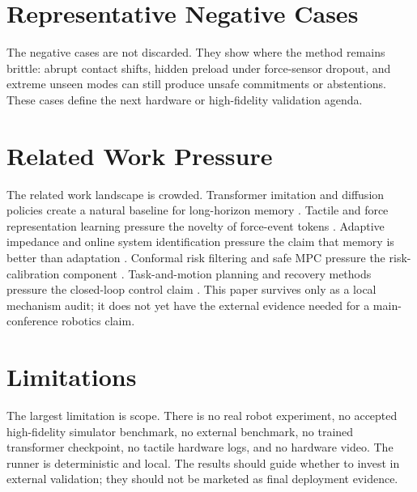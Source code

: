 \documentclass{article}
\begin{document}
\section{Representative Negative Cases}

The negative cases are not discarded. They show where the method remains brittle: abrupt contact shifts, hidden preload under force-sensor dropout, and extreme unseen modes can still produce unsafe commitments or abstentions. These cases define the next hardware or high-fidelity validation agenda.

\section{Related Work Pressure}
The related work landscape is crowded. Transformer imitation and diffusion policies create a natural baseline for long-horizon memory \citep{marneweck2018neural19,li2018semantic20,sun2023superpoint21,yamazaki2023vltint22,yang2025swin3d23,rebai2012bioinspired24,decoteau2009effects25,edwardsndthe26,hu2024research27}. Tactile and force representation learning pressure the novelty of force-event tokens \citep{luo2025research28,dong2025development29,xu2022visual30,ji2021visual31,lee2020audiovisual32,cao2023scenegate33,zhao2022a34,kim2023hiint35,urrea2024enhancing36}. Adaptive impedance and online system identification pressure the claim that memory is better than adaptation \citep{holzschuh2025pdetransformer37,zhu2025move38,lu2026gsmem39,liang2023mcuformer40,kang2023think41,ji2024sstrans42,queier2021emergence43,geng2021dynamic44,lin2021sceneintuitive45}. Conformal risk filtering and safe MPC pressure the risk-calibration component \citep{singh2022visual46,tran2025enhanced47,liu2022transformer48,fukushima2022object49,pan2026force50,wangndsavetrack51,zuo2026a52,salzmann2024scenegraph53,li2023transformerbased54}. Task-and-motion planning and recovery methods pressure the closed-loop control claim \citep{suulker2024let55,chatterjee20253dsceneformer56,honda2022multitask57,huang2026robotic58,zuo2026a59,leyvavallina2024regressing60,garcia2009survey61,elshamy2025a62,ohno2026beyond63}. This paper survives only as a local mechanism audit; it does not yet have the external evidence needed for a main-conference robotics claim.

\section{Limitations}
The largest limitation is scope. There is no real robot experiment, no accepted high-fidelity simulator benchmark, no external benchmark, no trained transformer checkpoint, no tactile hardware logs, and no hardware video. The runner is deterministic and local. The results should guide whether to invest in external validation; they should not be marketed as final deployment evidence.
\end{document}
